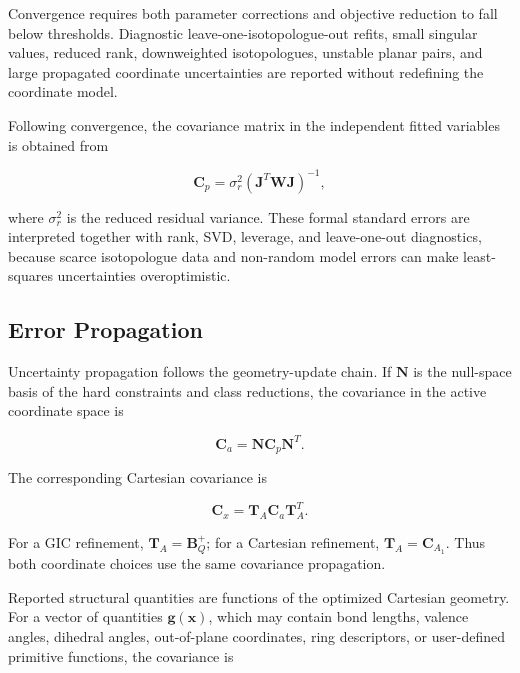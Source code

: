 \documentclass[aip,jcp,reprint,longbibliography,floatfix]{revtex4-2}
\begin{document}
Convergence requires both parameter corrections and objective reduction to fall
below thresholds. Diagnostic leave-one-isotopologue-out refits, small singular
values, reduced rank, downweighted isotopologues, unstable planar pairs, and
large propagated coordinate uncertainties are reported without redefining the
coordinate model.

Following convergence, the covariance matrix in the independent fitted
variables is obtained from

\begin{equation}
\mathbf{C}_{p}
=
\sigma_r^2
\left(
\mathbf{J}^{T}
\mathbf{W}
\mathbf{J}
\right)^{-1},
\end{equation}

where $\sigma_r^2$ is the reduced residual variance. These formal standard
errors are interpreted together with rank, SVD, leverage, and leave-one-out
diagnostics, because scarce isotopologue data and non-random model errors can
make least-squares uncertainties overoptimistic.\cite{Demaison2007EquilibriumReview}

\subsection{Error Propagation}

Uncertainty propagation follows the geometry-update chain. If $\mathbf{N}$ is
the null-space basis of the hard
constraints and class reductions, the covariance in the active coordinate
space is

\begin{equation}
\mathbf{C}_{a}
=
\mathbf{N}
\mathbf{C}_{p}
\mathbf{N}^{T}.
\end{equation}

The corresponding Cartesian covariance is

\begin{equation}
\mathbf{C}_{x}
=
\mathbf{T}_{A}
\mathbf{C}_{a}
\mathbf{T}_{A}^{T}.
\end{equation}

For a GIC refinement, $\mathbf{T}_{A}=\mathbf{B}_{Q}^{+}$; for a Cartesian
refinement, $\mathbf{T}_{A}=\mathbf{C}_{A_1}$. Thus both coordinate choices use
the same covariance propagation.

Reported structural quantities are functions of the optimized Cartesian
geometry. For a vector of quantities
$\mathbf{g}(\mathbf{x})$, which may contain bond lengths, valence angles,
dihedral angles, out-of-plane coordinates, ring descriptors, or user-defined
primitive functions, the covariance is
\end{document}
